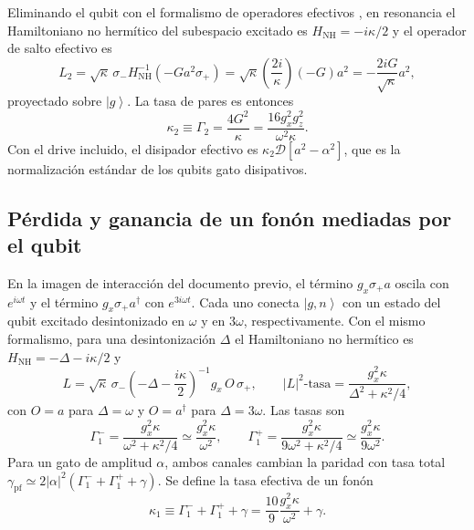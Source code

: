 \documentclass[11pt]{report}
\newcommand{\ket}[1]{\left|#1\right\rangle}
\newcommand{\spl}{\sigma_{+}}
\newcommand{\smi}{\sigma_{-}}
\begin{document}
Eliminando el qubit con el formalismo de operadores efectivos \cite{ReiterSorensen2012}, en resonancia el Hamiltoniano no herm\'itico del subespacio excitado es $H_{\mathrm{NH}}=-i\kappa/2$ y el operador de salto efectivo es
\begin{equation}
L_{2}=\sqrt{\kappa}\,\smi H_{\mathrm{NH}}^{-1}(-G a^{2}\spl)=\sqrt{\kappa}\left(\frac{2i}{\kappa}\right)(-G)a^{2}=-\frac{2iG}{\sqrt{\kappa}}a^{2},
\end{equation}
proyectado sobre $\ket{g}$. La tasa de pares es entonces
\begin{equation}
\kappa_{2}\equiv\Gamma_{2}=\frac{4G^{2}}{\kappa}=\frac{16g_{x}^{2}g_{z}^{2}}{\omega^{2}\kappa}.
\label{eq:k2}
\end{equation}
Con el drive incluido, el disipador efectivo es $\kappa_{2}\mathcal{D}[a^{2}-\alpha^{2}]$, que es la normalizaci\'on est\'andar de los qubits gato disipativos.

\subsection{P\'erdida y ganancia de un fon\'on mediadas por el qubit}

En la imagen de interacci\'on del documento previo, el t\'ermino $g_{x}\spl a$ oscila con $e^{i\omega t}$ y el t\'ermino $g_{x}\spl a^{\dagger}$ con $e^{3i\omega t}$. Cada uno conecta $\ket{g,n}$ con un estado del qubit excitado desintonizado en $\omega$ y en $3\omega$, respectivamente. Con el mismo formalismo, para una desintonizaci\'on $\Delta$ el Hamiltoniano no herm\'itico es $H_{\mathrm{NH}}=-\Delta-i\kappa/2$ y
\begin{equation}
L=\sqrt{\kappa}\,\smi\left(-\Delta-\frac{i\kappa}{2}\right)^{-1}g_{x}\,O\,\spl,\qquad |L|^{2}\text{-tasa}=\frac{g_{x}^{2}\kappa}{\Delta^{2}+\kappa^{2}/4},
\end{equation}
con $O=a$ para $\Delta=\omega$ y $O=a^{\dagger}$ para $\Delta=3\omega$. Las tasas son
\begin{equation}
\Gamma_{1}^{-}=\frac{g_{x}^{2}\kappa}{\omega^{2}+\kappa^{2}/4}\simeq\frac{g_{x}^{2}\kappa}{\omega^{2}},\qquad
\Gamma_{1}^{+}=\frac{g_{x}^{2}\kappa}{9\omega^{2}+\kappa^{2}/4}\simeq\frac{g_{x}^{2}\kappa}{9\omega^{2}}.
\label{eq:G1}
\end{equation}
Para un gato de amplitud $\alpha$, ambos canales cambian la paridad con tasa total $\gamma_{\mathrm{pf}}\simeq2|\alpha|^{2}(\Gamma_{1}^{-}+\Gamma_{1}^{+}+\gamma)$. Se define la tasa efectiva de un fon\'on
\begin{equation}
\kappa_{1}\equiv\Gamma_{1}^{-}+\Gamma_{1}^{+}+\gamma=\frac{10}{9}\frac{g_{x}^{2}\kappa}{\omega^{2}}+\gamma .
\label{eq:k1}
\end{equation}
\end{document}

